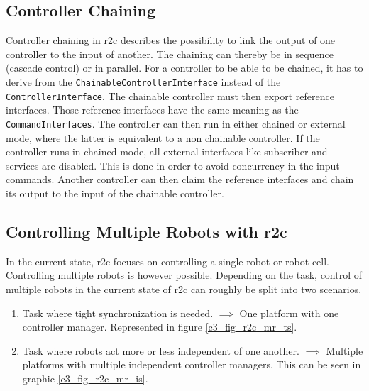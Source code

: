 \subsection{Controller Chaining}
Controller chaining in \gls{r2c} describes the possibility to link the output of one controller to the input of another. The chaining can thereby be in sequence (cascade control) or in parallel.\newline
For a controller to be able to be chained, it has to derive from the \texttt{ChainableControllerInterface} instead of the \texttt{ControllerInterface}. The chainable controller must then export reference interfaces. Those reference interfaces have the same meaning as the \texttt{CommandInterfaces}. The controller can then run in either chained or external mode, where the latter is equivalent to a non chainable controller. If the controller runs in chained mode, all external interfaces like subscriber and services are disabled. This is done in order to avoid concurrency in the input commands. Another controller can then claim the reference interfaces and chain its output to the input of the chainable controller.

\subsection{Controlling Multiple Robots with \gls{r2c}}\label{c3_sec_controlling_multiple_robots}
In the current state, \gls{r2c} focuses on controlling a single robot or robot cell. Controlling multiple robots is however possible. Depending on the task, control of multiple robots in the current state of \gls{r2c} can roughly be split into two scenarios.
\begin{enumerate}[start=1,label={\upshape \texttt{Scenario \arabic*:}},wide = 0pt, leftmargin = 3em]
    \item Task where tight synchronization is needed. $\implies$ One platform with one controller manager. Represented in figure \ref{c3_fig_r2c_mr_ts}.
    \item Task where robots act more or less independent of one another. $\implies$ Multiple platforms with multiple independent controller managers. This can be seen in graphic \ref{c3_fig_r2c_mr_is}.
\end{enumerate}

